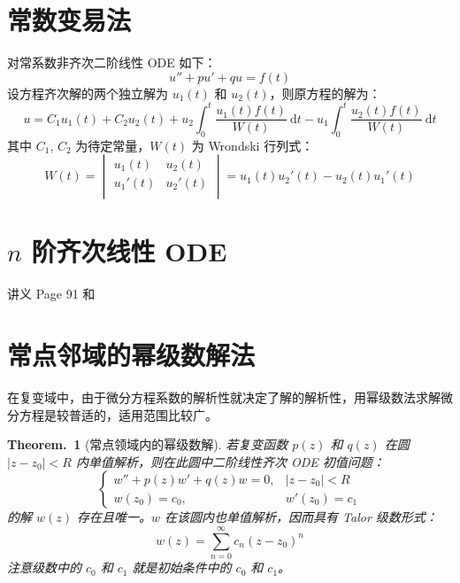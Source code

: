 \documentclass[UTF8]{report}
\theoremstyle{MyLineTheoremStyle} %
\theoremstyle{MyBlockTheoremStyle} %
\newtheorem{BlockTheorem}[LineTheorem]{Theorem.\,} %
\theoremstyle{MySubsubsectionStyle} %
\begin{document}
\section{常数变易法}
对常系数非齐次二阶线性 ODE 如下：
\begin{equation}
u'' + pu' + qu = f(t)
\end{equation}
设方程齐次解的两个独立解为 $u_1(t)$ 和 $u_2(t)$，则原方程的解为：
\begin{equation}
u = C_1u_1(t) + C_2u_2(t) + u_2\int_{0}^{t} \frac{u_1(t)f(t)}{W(t)}\ \mathrm{d}t - u_1\int_{0}^{t} \frac{u_2(t)f(t)}{W(t)}\ \mathrm{d}t
\end{equation}
其中 $C_1$, $C_2$ 为待定常量，$W(t)$ 为 Wrondski 行列式：
\begin{equation}
W(t)= 
\begin{vmatrix}
u_1(t) & u_2(t) \\
u_1'(t) & u_2'(t) \\
\end{vmatrix}
= u_1(t)u_2'(t) - u_2(t)u_1'(t)
\end{equation}


\section{$n$ 阶齐次线性 ODE}
讲义 Page 91 和 

\section{常点邻域的幂级数解法}
在复变域中，由于微分方程系数的解析性就决定了解的解析性，用幂级数法求解微分方程是较普适的，适用范围比较广。

\begin{BlockTheorem}[常点领域内的幂级数解]\label{常点领域内的幂级数解}
若复变函数 $p(z)$ 和 $q(z)$ 在圆 $| z - z_0 | < R$ 内单值解析，则在此圆中二阶线性齐次 ODE 初值问题：
\begin{equation}
\begin{cases}
    w'' + p(z)w' + q(z)w = 0, & | z - z_0 | < R \\
    w(z_0) = c_0, & w'(z_0) = c_1
\end{cases}
\end{equation}
的解 $w(z)$ 存在且唯一。$w$ 在该圆内也单值解析，因而具有 Talor 级数形式：
\begin{equation}
w(z) = \sum_{n=0}^{\infty} c_n (z - z_0)^n
\end{equation}
注意级数中的 $c_0$ 和 $c_1$ 就是初始条件中的 $c_0$ 和 $c_1$。
\end{BlockTheorem}
\end{document}
